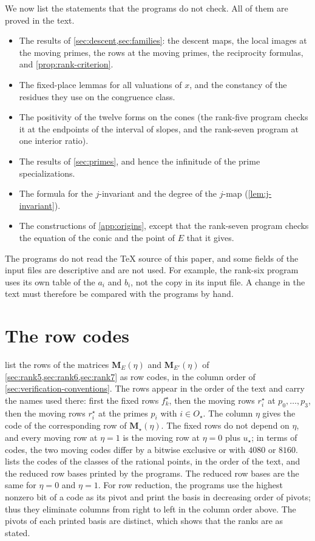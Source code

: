 We now list the statements that the programs do not check. All of them are proved in the text.
\begin{itemize}
\item The results of \cref{sec:descent,sec:families}: the descent maps, the local images at the moving primes, the rows at the moving primes, the reciprocity formulas, and \cref{prop:rank-criterion}.
\item The fixed-place lemmas for all valuations of $x$, and the constancy of the residues they use on the congruence class.
\item The positivity of the twelve forms on the cones (the rank-five program checks it at the endpoints of the interval of slopes, and the rank-seven program at one interior ratio).
\item The results of \cref{sec:primes}, and hence the infinitude of the prime specializations.
\item The formula for the $j$-invariant and the degree of the $j$-map (\cref{lem:j-invariant}).
\item The constructions of \cref{app:origins}, except that the rank-seven program checks the equation of the conic and the point of $E$ that it gives.
\end{itemize}
The programs do not read the \TeX{} source of this paper, and some fields of the input files are descriptive and are not used. For example, the rank-six program uses its own table of the $a_i$ and $b_i$, not the copy in its input file. A change in the text must therefore be compared with the programs by hand.

\section{The row codes}\label{sec:verification-codes}

 list the rows of the matrices $\mathbf M_E(\eta)$ and $\mathbf M_{E'}(\eta)$ of \cref{sec:rank5,sec:rank6,sec:rank7} as row codes, in the column order of \cref{sec:verification-conventions}. The rows appear in the order of the text and carry the names used there: first the fixed rows $f^\star_k$, then the moving rows $r^\star_i$ at $p_0,\dots,p_3$, then the moving rows $r^\star_i$ at the primes $p_i$ with $i\in O_\star$. The column $\eta$ gives the code of the corresponding row of $\mathbf M_\star(\eta)$. The fixed rows do not depend on $\eta$, and every moving row at $\eta=1$ is the moving row at $\eta=0$ plus $u_\star$; in terms of codes, the two moving codes differ by a bitwise exclusive or with $4080$ or $8160$.  lists the codes of the classes of the rational points, in the order of the text, and the reduced row bases printed by the programs. The reduced row bases are the same for $\eta=0$ and $\eta=1$. For row reduction, the programs use the highest nonzero bit of a code as its pivot and print the basis in decreasing order of pivots; thus they eliminate columns from right to left in the column order above. The pivots of each printed basis are distinct, which shows that the ranks are as stated.

